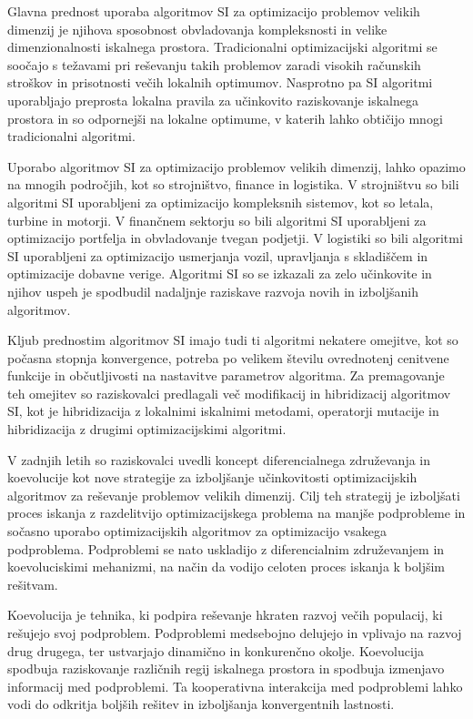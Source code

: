 Glavna prednost uporaba algoritmov SI za optimizacijo problemov velikih dimenzij je njihova sposobnost obvladovanja kompleksnosti in velike dimenzionalnosti iskalnega prostora.
Tradicionalni optimizacijski algoritmi se soočajo s težavami pri reševanju takih problemov zaradi visokih računskih stroškov in prisotnosti večih lokalnih optimumov.
Nasprotno pa SI algoritmi uporabljajo preprosta lokalna pravila za učinkovito raziskovanje iskalnega prostora in so odpornejši na lokalne optimume, v katerih lahko obtičijo mnogi tradicionalni algoritmi.

Uporabo algoritmov SI za optimizacijo problemov velikih dimenzij, lahko opazimo na mnogih področjih, kot so strojništvo, finance in logistika.
V strojništvu so bili algoritmi SI uporabljeni za optimizacijo kompleksnih sistemov, kot so letala, turbine in motorji.
V finančnem sektorju so bili algoritmi SI uporabljeni za optimizacijo portfelja in obvladovanje tvegan podjetji.
V logistiki so bili algoritmi SI uporabljeni za optimizacijo usmerjanja vozil, upravljanja s skladiščem in optimizacije dobavne verige.
Algoritmi SI so se izkazali za zelo učinkovite in njihov uspeh je spodbudil nadaljnje raziskave razvoja novih in izboljšanih algoritmov.

Kljub prednostim algoritmov SI imajo tudi ti algoritmi nekatere omejitve, kot so počasna stopnja konvergence, potreba po velikem številu ovrednotenj cenitvene funkcije in občutljivosti na nastavitve parametrov algoritma.
Za premagovanje teh omejitev so raziskovalci predlagali več modifikacij in hibridizacij algoritmov SI, kot je hibridizacija z lokalnimi iskalnimi metodami, operatorji mutacije in hibridizacija z drugimi optimizacijskimi algoritmi.

V zadnjih letih so raziskovalci uvedli koncept diferencialnega združevanja in koevolucije kot nove strategije za izboljšanje učinkovitosti optimizacijskih algoritmov za reševanje problemov velikih dimenzij.
Cilj teh strategij je izboljšati proces iskanja z razdelitvijo optimizacijskega problema na manjše podprobleme in sočasno uporabo optimizacijskih algoritmov za optimizacijo vsakega podproblema.
Podproblemi se nato uskladijo z diferencialnim združevanjem in koevoluciskimi mehanizmi, na način da vodijo celoten proces iskanja k boljšim rešitvam.

Koevolucija je tehnika, ki podpira reševanje hkraten razvoj večih populacij, ki rešujejo svoj podproblem.
Podproblemi medsebojno delujejo in vplivajo na razvoj drug drugega, ter ustvarjajo dinamično in konkurenčno okolje.
Koevolucija spodbuja raziskovanje različnih regij iskalnega prostora in spodbuja izmenjavo informacij med podproblemi.
Ta kooperativna interakcija med podproblemi lahko vodi do odkritja boljših rešitev in izboljšanja konvergentnih lastnosti.

